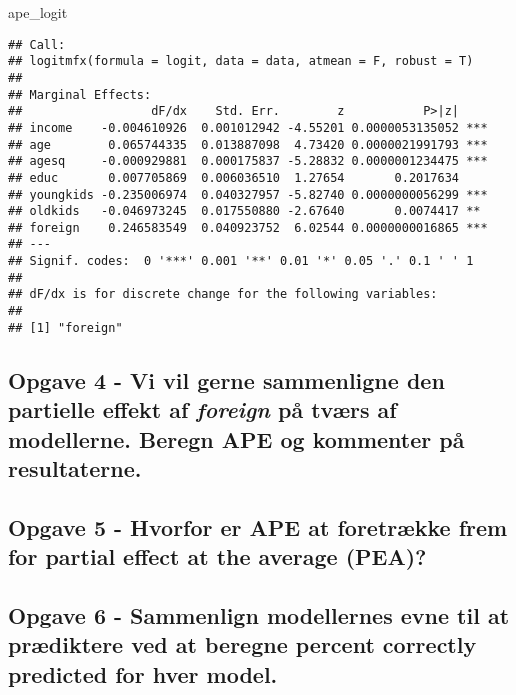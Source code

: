 \documentclass[
]{article}
\newenvironment{Shaded}{\begin{snugshade}}{\end{snugshade}}
\newcommand{\NormalTok}[1]{#1}
\begin{document}
\begin{Shaded}
\begin{Highlighting}[]
\NormalTok{ape\_logit}
\end{Highlighting}
\end{Shaded}

\begin{verbatim}
## Call:
## logitmfx(formula = logit, data = data, atmean = F, robust = T)
## 
## Marginal Effects:
##                  dF/dx    Std. Err.        z           P>|z|    
## income    -0.004610926  0.001012942 -4.55201 0.0000053135052 ***
## age        0.065744335  0.013887098  4.73420 0.0000021991793 ***
## agesq     -0.000929881  0.000175837 -5.28832 0.0000001234475 ***
## educ       0.007705869  0.006036510  1.27654       0.2017634    
## youngkids -0.235006974  0.040327957 -5.82740 0.0000000056299 ***
## oldkids   -0.046973245  0.017550880 -2.67640       0.0074417 ** 
## foreign    0.246583549  0.040923752  6.02544 0.0000000016865 ***
## ---
## Signif. codes:  0 '***' 0.001 '**' 0.01 '*' 0.05 '.' 0.1 ' ' 1
## 
## dF/dx is for discrete change for the following variables:
## 
## [1] "foreign"
\end{verbatim}

\hypertarget{opgave-4---vi-vil-gerne-sammenligne-den-partielle-effekt-af-puxe5-tvuxe6rs-af-modellerne.-beregn-ape-og-kommenter-puxe5-resultaterne.}{%
\subsection{\texorpdfstring{Opgave 4 - Vi vil gerne sammenligne den
partielle effekt af \textit{foreign} på tværs af modellerne. Beregn APE
og kommenter på
resultaterne.}{Opgave 4 - Vi vil gerne sammenligne den partielle effekt af  på tværs af modellerne. Beregn APE og kommenter på resultaterne.}}\label{opgave-4---vi-vil-gerne-sammenligne-den-partielle-effekt-af-puxe5-tvuxe6rs-af-modellerne.-beregn-ape-og-kommenter-puxe5-resultaterne.}}

\hypertarget{opgave-5---hvorfor-er-ape-at-foretruxe6kke-frem-for-partial-effect-at-the-average-pea}{%
\subsection{Opgave 5 - Hvorfor er APE at foretrække frem for partial
effect at the average
(PEA)?}\label{opgave-5---hvorfor-er-ape-at-foretruxe6kke-frem-for-partial-effect-at-the-average-pea}}

\hypertarget{opgave-6---sammenlign-modellernes-evne-til-at-pruxe6diktere-ved-at-beregne-percent-correctly-predicted-for-hver-model.}{%
\subsection{Opgave 6 - Sammenlign modellernes evne til at prædiktere ved
at beregne percent correctly predicted for hver
model.}\label{opgave-6---sammenlign-modellernes-evne-til-at-pruxe6diktere-ved-at-beregne-percent-correctly-predicted-for-hver-model.}}
\end{document}
